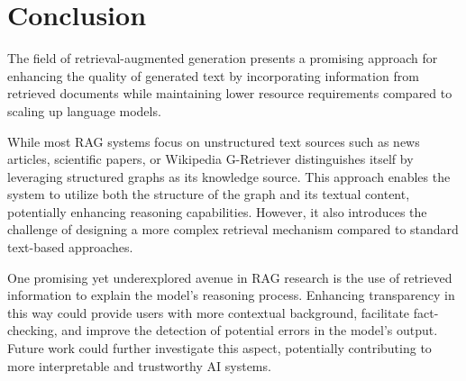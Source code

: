 \section{Conclusion}

The field of retrieval-augmented generation presents a promising approach for enhancing the quality of generated text by incorporating information from retrieved documents while maintaining lower resource requirements compared to scaling up language models.

While most RAG systems focus on unstructured text sources \textemdash{} such as news articles, scientific papers, or Wikipedia \textemdash{} G-Retriever distinguishes itself by leveraging structured graphs as its knowledge source.
This approach enables the system to utilize both the structure of the graph and its textual content, potentially enhancing reasoning capabilities.
However, it also introduces the challenge of designing a more complex retrieval mechanism compared to standard text-based approaches.

One promising yet underexplored avenue in RAG research is the use of retrieved information to explain the model's reasoning process.
Enhancing transparency in this way could provide users with more contextual background, facilitate fact-checking, and improve the detection of potential errors in the model's output.
Future work could further investigate this aspect, potentially contributing to more interpretable and trustworthy AI systems.
